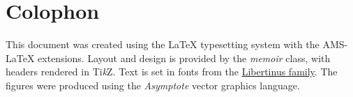 \documentclass[../book/calcnotes.tex]{subfiles}
\begin{document}
\chapter{Colophon}

This document was created using the \LaTeX{} typesetting system with the AMS-\LaTeX{} extensions.
Layout and design is provided by the \textit{memoir} class, with headers rendered in Ti\textit{k}Z.
Text is set in fonts from the \href{https://github.com/alif-type/libertinus}{Libertinus family}.
The figures were produced using the \textit{Asymptote} vector graphics language.
\end{document}
